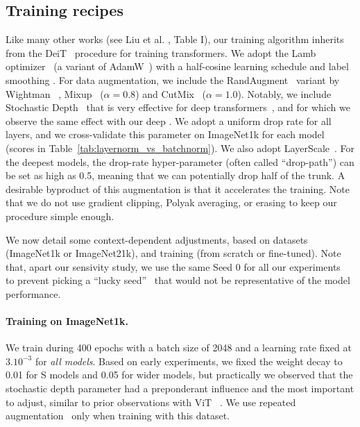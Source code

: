




\subsection{Training recipes} 
\label{sec:training_recipes}

% 
Like many other works (see Liu et al. \cite{liu2021survey}, Table I), our training algorithm inherits from the DeiT~\cite{touvron2021going} procedure for training transformers. 
We adopt the Lamb optimizer~\cite{you20lamb} (a variant of AdamW~\cite{Loshchilov2017AdamW}) with a half-cosine learning schedule and label smoothing \cite{Szegedy2016RethinkingTI}.
For data augmentation, we include the RandAugment~\cite{Cubuk2019RandAugmentPA} variant by Wightman \etal~\cite{wightman2021resnet}, Mixup~\cite{Zhang2017Mixup} ($\alpha=0.8$) and CutMix~\cite{Yun2019CutMix} ($\alpha=1.0$). 
Notably, we include Stochastic Depth~\cite{Huang2016DeepNW} that is very effective for deep transformers~\cite{touvron2021going}, and for which we observe the same effect with our deep \ournet.  
We adopt a uniform drop rate for all layers, and we cross-validate this parameter on ImageNet1k for each model (scores in  Table~\ref{tab:layernorm_vs_batchnorm}). 
We also adopt LayerScale~\cite{touvron2021going}. 
For the deepest models, the drop-rate hyper-parameter (often called ``drop-path'') can be set as high as 0.5, meaning that we can potentially drop half of the trunk. 
A desirable byproduct of this augmentation is that it accelerates the training. 
Note that we do not use gradient clipping, Polyak averaging, or erasing to keep our procedure simple enough. 

We now detail some context-dependent adjustments, based on datasets (ImageNet1k or ImageNet21k), and training (from scratch or fine-tuned). Note that, apart our sensivity study, we use the same Seed 0 for all our experiments~\cite{wightman2021resnet} to prevent picking a ``lucky seed''~\cite{picard21luckyseed} that would not be representative of the model performance. 


\paragraph{Training on ImageNet1k.} We train during 400 epochs with a batch size of 2048 and a learning rate fixed at $3.10^{-3}$ for \emph{all models}.  Based on early experiments, we fixed the weight decay to 0.01 for S models and 0.05 for wider models, but practically we observed that the stochastic depth parameter had a preponderant  influence and the most important to adjust, similar to prior observations with ViT \etal~\cite{touvron2021going}. 
%
We use repeated augmentation~\cite{berman2019multigrain} only when training with this dataset.  %




